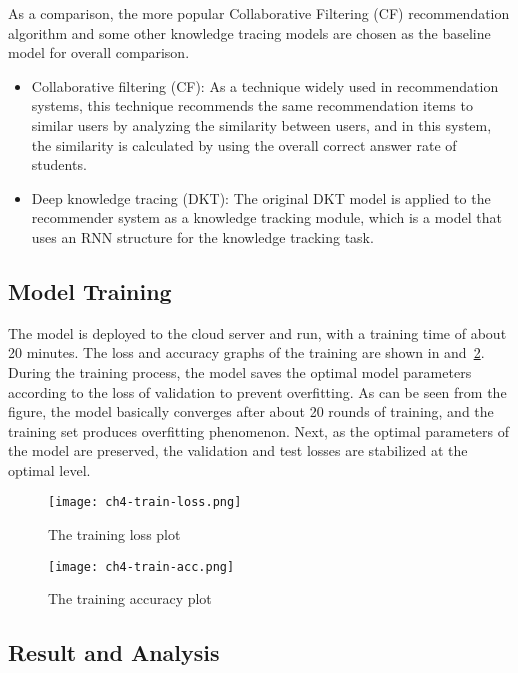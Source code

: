 As a comparison, the more popular Collaborative Filtering (CF) recommendation algorithm and some other knowledge tracing models are chosen as the baseline model for overall comparison.
\begin{itemize}
    \item Collaborative filtering (CF): As a technique widely used in recommendation systems, this technique recommends the same recommendation items to similar users by analyzing the similarity between users, and in this system, the similarity is calculated by using the overall correct answer rate of students.
    \item Deep knowledge tracing (DKT): The original DKT model is applied to the recommender system as a knowledge tracking module, which is a model that uses an RNN structure for the knowledge tracking task.
\end{itemize}



\subsection{Model Training}
%
The model is deployed to the cloud server and run, with a training time of about 20 minutes. The loss and accuracy graphs of the training are shown in \figname{\ref{fig:ch4-train-loss}} and~\ref{fig:ch4-train-acc}. During the training process, the model saves the optimal model parameters according to the loss of validation to prevent overfitting. As can be seen from the figure, the model basically converges after about 20 rounds of training, and the training set produces overfitting phenomenon. Next, as the optimal parameters of the model are preserved, the validation and test losses are stabilized at the optimal level.

\begin{figure}[htbp!]
    \centering
    \texttt{[image: ch4-train-loss.png]}
    \caption{The training loss plot}\label{fig:ch4-train-loss}
\end{figure}

\begin{figure}[htbp!]
    \centering
    \texttt{[image: ch4-train-acc.png]}
    \caption{The training accuracy plot}\label{fig:ch4-train-acc}
\end{figure}



\subsection{Result and Analysis}

